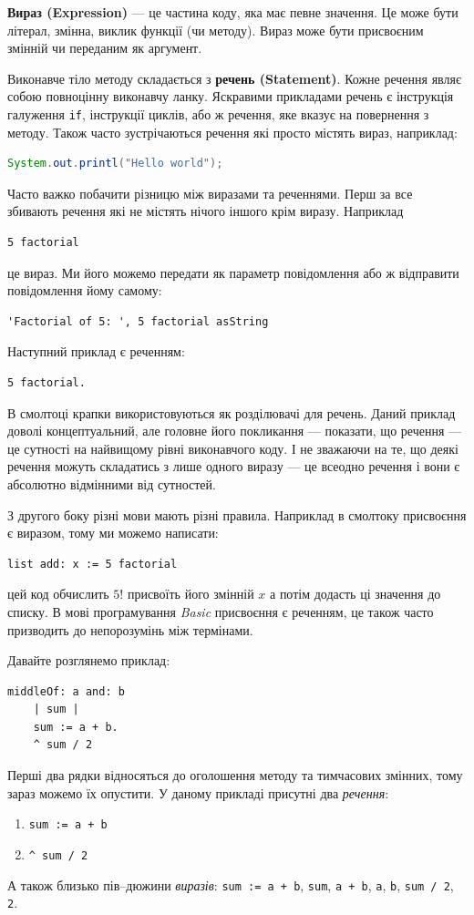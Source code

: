 \documentclass[12pt,a4paper]{article}
\begin{document}
\textbf{Вираз (Expression)} --- це частина коду, яка має певне значення. Це може бути літерал, змінна, виклик функції (чи методу). Вираз може бути присвоєним змінній чи переданим як аргумент.

Виконавче тіло методу складається з \textbf{речень (Statement)}. Кожне речення являє собою повноцінну виконавчу ланку. Яскравими прикладами речень є інструкція галуження \lstinline$if$, інструкції циклів, або ж речення, яке вказує на повернення з методу. Також часто зустрічаються речення які просто містять вираз, наприклад:
\begin{lstlisting}[language=Java]
System.out.printl("Hello world");
\end{lstlisting}

Часто важко побачити різницю між виразами та реченнями. Перш за все збивають речення які не містять нічого іншого крім виразу. Наприклад
\begin{lstlisting}[language=Smalltalk]
5 factorial
\end{lstlisting}
це вираз. Ми його можемо передати як параметр повідомлення або ж відправити повідомлення йому самому:
\begin{lstlisting}[language=Smalltalk]
'Factorial of 5: ', 5 factorial asString
\end{lstlisting}
Наступний приклад є реченням:
\begin{lstlisting}[language=Smalltalk]
5 factorial.
\end{lstlisting}
В смолтоці крапки використовуються як розділювачі для речень. Даний приклад доволі концептуальний, але головне його покликання --- показати, що речення --- це сутності на найвищому рівні виконавчого коду. І не зважаючи на те, що деякі речення можуть складатись з лише одного виразу --- це всеодно речення і вони є абсолютно відмінними від сутностей.

З другого боку різні мови мають різні правила. Наприклад в смолтоку присвоєння є виразом, тому ми можемо написати:
\begin{lstlisting}[language=Smalltalk]
list add: x := 5 factorial
\end{lstlisting}
цей код обчислить $5!$ присвоїть його змінній $x$ а потім додасть ці значення до списку. В мові програмування \emph{Basic} присвоєння є реченням, це також часто призводить до непорозумінь між термінами.

Давайте розглянемо приклад:
\begin{lstlisting}[language=Smalltalk]
middleOf: a and: b
    | sum |
    sum := a + b.
    ^ sum / 2
\end{lstlisting}
Перші два рядки відносяться до оголошення методу та тимчасових змінних, тому зараз можемо їх опустити. У даному прикладі присутні два \emph{речення}:
\begin{enumerate}
	\item \lstinline$sum := a + b$
	\item \lstinline$^ sum / 2$
\end{enumerate}
А також близько пів--дюжини \emph{виразів}: \lstinline$sum := a + b$, \lstinline$sum$, \lstinline$a + b$, \lstinline$a$, \lstinline$b$, \lstinline$sum / 2$, \lstinline$2$.
\end{document}
